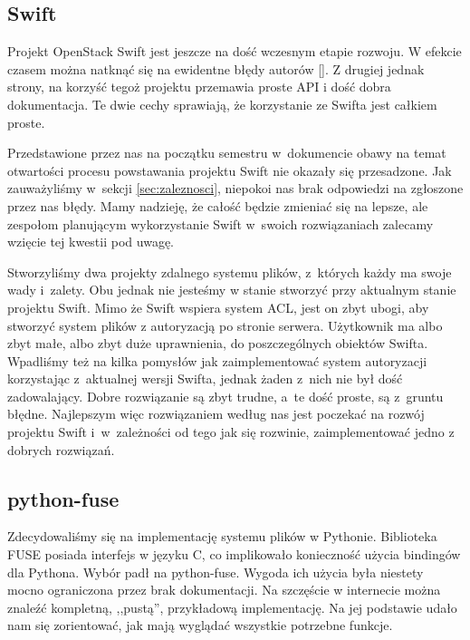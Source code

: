\subsection{Swift}

Projekt OpenStack Swift jest jeszcze na dość wczesnym etapie rozwoju. W
efekcie czasem można natknąć się na ewidentne błędy autorów []. Z drugiej jednak strony, na korzyść tegoż projektu przemawia proste
API i dość dobra dokumentacja. Te dwie cechy sprawiają, że korzystanie ze
Swifta jest całkiem proste.

Przedstawione przez nas na początku semestru w~dokumencie \cite{jano-anal-atech}
obawy na temat otwartości procesu powstawania projektu Swift nie okazały się
przesadzone. Jak zauważyliśmy w~sekcji \ref{sec:zaleznosci}, niepokoi nas brak
odpowiedzi na zgłoszone przez nas błędy. Mamy nadzieję, że całość będzie
zmieniać się na lepsze, ale zespołom planującym wykorzystanie Swift w~swoich
rozwiązaniach zalecamy wzięcie tej kwestii pod uwagę.

Stworzyliśmy dwa projekty zdalnego systemu plików, z~których każdy ma swoje
wady i~zalety. Obu jednak nie jesteśmy w stanie stworzyć przy aktualnym stanie
projektu Swift. Mimo że Swift wspiera system ACL, jest on zbyt ubogi, aby
stworzyć system plików z autoryzacją po stronie serwera. Użytkownik ma albo zbyt
małe, albo zbyt duże uprawnienia, do poszczególnych obiektów Swifta. Wpadliśmy
też na kilka pomysłów jak zaimplementować system autoryzacji korzystając
z~aktualnej wersji Swifta, jednak żaden z~nich nie był dość zadowalający. Dobre
rozwiązanie są zbyt trudne, a~te dość proste, są z~gruntu błędne. Najlepszym
więc rozwiązaniem według nas jest poczekać na rozwój projektu Swift
i~w~zależności od tego jak się rozwinie, zaimplementować jedno z dobrych
rozwiązań.

\subsection{python-fuse}

Zdecydowaliśmy się na implementację systemu plików w Pythonie. Biblioteka FUSE
posiada interfejs w języku C, co implikowało konieczność użycia bindingów dla
Pythona. Wybór padł na python-fuse. Wygoda ich użycia była niestety mocno
ograniczona przez brak dokumentacji. Na szczęście w internecie można znaleźć
kompletną, ,,pustą'', przykładową implementację. Na jej podstawie udało nam się
zorientować, jak mają wyglądać wszystkie potrzebne funkcje.


